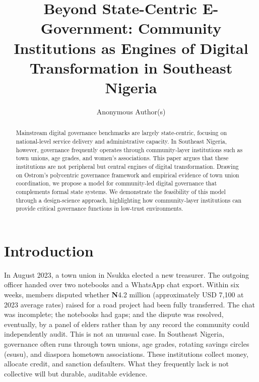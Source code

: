 \documentclass[sigconf,anonymous]{acmart}
\begin{document}
\title{Beyond State-Centric E-Government: Community Institutions as Engines of Digital Transformation in Southeast Nigeria}

\author{Anonymous Author(s)}

\begin{abstract}
Mainstream digital governance benchmarks are largely state-centric, focusing on national-level service delivery and administrative capacity. In Southeast Nigeria, however, governance frequently operates through community-layer institutions such as town unions, age grades, and women's associations. This paper argues that these institutions are not peripheral but central engines of digital transformation. Drawing on Ostrom's polycentric governance framework and empirical evidence of town union coordination, we propose a model for community-led digital governance that complements formal state systems. We demonstrate the feasibility of this model through a design-science approach, highlighting how community-layer institutions can provide critical governance functions in low-trust environments.
\end{abstract}



\maketitle

\section{Introduction}

In August 2023, a town union in Nsukka elected a new treasurer. The outgoing officer handed over two notebooks and a WhatsApp chat export. Within six weeks, members disputed whether \textbf{N}4.2 million (approximately USD 7,100 at 2023 average rates) raised for a road project had been fully transferred. The chat was incomplete; the notebooks had gaps; and the dispute was resolved, eventually, by a panel of elders rather than by any record the community could independently audit. This is not an unusual case. In Southeast Nigeria, governance often runs through town unions, age grades, rotating savings circles (esusu), and diaspora hometown associations. These institutions collect money, allocate credit, and sanction defaulters. What they frequently lack is not collective will but durable, auditable evidence.
\end{document}
